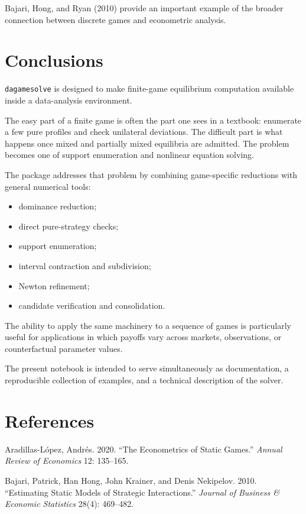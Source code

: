 \documentclass[11pt]{article}
\providecommand{\tightlist}{%
      \setlength{\itemsep}{0pt}\setlength{\parskip}{0pt}}
\begin{document}
Bajari, Hong, and Ryan (2010) provide an important example of the
broader connection between discrete games and econometric analysis.

    \section{Conclusions}\label{conclusions}

\texttt{dagamesolve} is designed to make finite-game equilibrium
computation available inside a data-analysis environment.

The easy part of a finite game is often the part one sees in a textbook:
enumerate a few pure profiles and check unilateral deviations. The
difficult part is what happens once mixed and partially mixed equilibria
are admitted. The problem becomes one of support enumeration and
nonlinear equation solving.

The package addresses that problem by combining game-specific reductions
with general numerical tools:

\begin{itemize}
\tightlist
\item
  dominance reduction;
\item
  direct pure-strategy checks;
\item
  support enumeration;
\item
  interval contraction and subdivision;
\item
  Newton refinement;
\item
  candidate verification and consolidation.
\end{itemize}

The ability to apply the same machinery to a sequence of games is
particularly useful for applications in which payoffs vary across
markets, observations, or counterfactual parameter values.

The present notebook is intended to serve simultaneously as
documentation, a reproducible collection of examples, and a technical
description of the solver.

    \section*{References}\label{references}

Aradillas-López, Andrés. 2020. ``The Econometrics of Static Games.''
\emph{Annual Review of Economics} 12: 135--165.

Bajari, Patrick, Han Hong, John Krainer, and Denis Nekipelov. 2010.
``Estimating Static Models of Strategic Interactions.'' \emph{Journal of
Business \& Economic Statistics} 28(4): 469--482.
\end{document}
